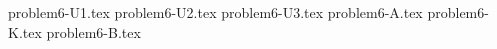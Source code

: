 \documentclass{article}
\begin{document}
{problem6-U1.tex}
{problem6-U2.tex}
{problem6-U3.tex}
{problem6-A.tex}
{problem6-K.tex}
{problem6-B.tex}
\end{document}
